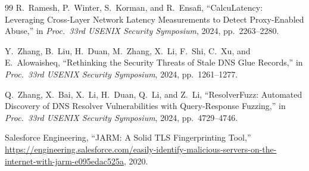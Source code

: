 \documentclass[12pt, a4paper, twoside]{report}
\begin{document}
\begin{thebibliography}{99}
R.~Ramesh, P.~Winter, S.~Korman, and R.~Ensafi,
``CalcuLatency: Leveraging Cross-Layer Network Latency Measurements to Detect Proxy-Enabled Abuse,''
in \textit{Proc.\ 33rd USENIX Security Symposium}, 2024, pp.\ 2263--2280.

Y.~Zhang, B.~Liu, H.~Duan, M.~Zhang, X.~Li, F.~Shi, C.~Xu, and E.~Alowaisheq,
``Rethinking the Security Threats of Stale DNS Glue Records,''
in \textit{Proc.\ 33rd USENIX Security Symposium}, 2024, pp.\ 1261--1277.

Q.~Zhang, X.~Bai, X.~Li, H.~Duan, Q.~Li, and Z.~Li,
``ResolverFuzz: Automated Discovery of DNS Resolver Vulnerabilities with Query-Response Fuzzing,''
in \textit{Proc.\ 33rd USENIX Security Symposium}, 2024, pp.\ 4729--4746.

Salesforce Engineering,
``JARM: A Solid TLS Fingerprinting Tool,''
\url{https://engineering.salesforce.com/easily-identify-malicious-servers-on-the-internet-with-jarm-e095edac525a}, 2020.

\end{thebibliography}
\end{document}
